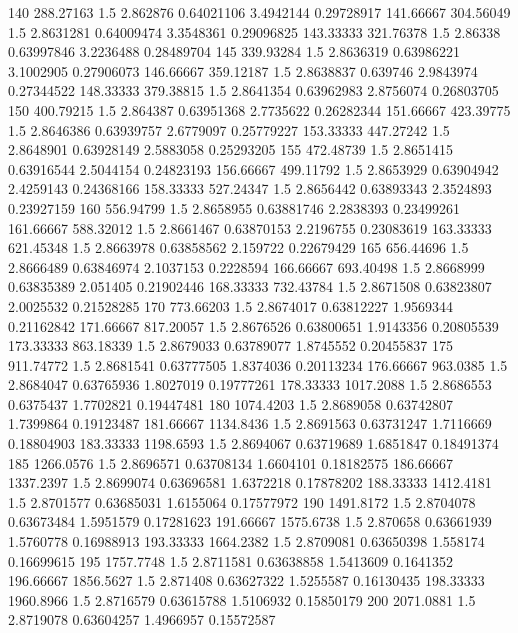 \documentclass[compact]{ne630handout}
\begin{document}
{140 288.27163 1.5 2.862876 0.64021106 3.4942144 0.29728917
141.66667 304.56049 1.5 2.8631281 0.64009474 3.3548361 0.29096825
143.33333 321.76378 1.5 2.86338 0.63997846 3.2236488 0.28489704
145 339.93284 1.5 2.8636319 0.63986221 3.1002905 0.27906073
146.66667 359.12187 1.5 2.8638837 0.639746 2.9843974 0.27344522
148.33333 379.38815 1.5 2.8641354 0.63962983 2.8756074 0.26803705
150 400.79215 1.5 2.864387 0.63951368 2.7735622 0.26282344
151.66667 423.39775 1.5 2.8646386 0.63939757 2.6779097 0.25779227
153.33333 447.27242 1.5 2.8648901 0.63928149 2.5883058 0.25293205
155 472.48739 1.5 2.8651415 0.63916544 2.5044154 0.24823193
156.66667 499.11792 1.5 2.8653929 0.63904942 2.4259143 0.24368166
158.33333 527.24347 1.5 2.8656442 0.63893343 2.3524893 0.23927159
160 556.94799 1.5 2.8658955 0.63881746 2.2838393 0.23499261
161.66667 588.32012 1.5 2.8661467 0.63870153 2.2196755 0.23083619
163.33333 621.45348 1.5 2.8663978 0.63858562 2.159722 0.22679429
165 656.44696 1.5 2.8666489 0.63846974 2.1037153 0.2228594
166.66667 693.40498 1.5 2.8668999 0.63835389 2.051405 0.21902446
168.33333 732.43784 1.5 2.8671508 0.63823807 2.0025532 0.21528285
170 773.66203 1.5 2.8674017 0.63812227 1.9569344 0.21162842
171.66667 817.20057 1.5 2.8676526 0.63800651 1.9143356 0.20805539
173.33333 863.18339 1.5 2.8679033 0.63789077 1.8745552 0.20455837
175 911.74772 1.5 2.8681541 0.63777505 1.8374036 0.20113234
176.66667 963.0385 1.5 2.8684047 0.63765936 1.8027019 0.19777261
178.33333 1017.2088 1.5 2.8686553 0.6375437 1.7702821 0.19447481
180 1074.4203 1.5 2.8689058 0.63742807 1.7399864 0.19123487
181.66667 1134.8436 1.5 2.8691563 0.63731247 1.7116669 0.18804903
183.33333 1198.6593 1.5 2.8694067 0.63719689 1.6851847 0.18491374
185 1266.0576 1.5 2.8696571 0.63708134 1.6604101 0.18182575
186.66667 1337.2397 1.5 2.8699074 0.63696581 1.6372218 0.17878202
188.33333 1412.4181 1.5 2.8701577 0.63685031 1.6155064 0.17577972
190 1491.8172 1.5 2.8704078 0.63673484 1.5951579 0.17281623
191.66667 1575.6738 1.5 2.870658 0.63661939 1.5760778 0.16988913
193.33333 1664.2382 1.5 2.8709081 0.63650398 1.558174 0.16699615
195 1757.7748 1.5 2.8711581 0.63638858 1.5413609 0.1641352
196.66667 1856.5627 1.5 2.871408 0.63627322 1.5255587 0.16130435
198.33333 1960.8966 1.5 2.8716579 0.63615788 1.5106932 0.15850179
200 2071.0881 1.5 2.8719078 0.63604257 1.4966957 0.15572587
}\promptdata
\end{document}
